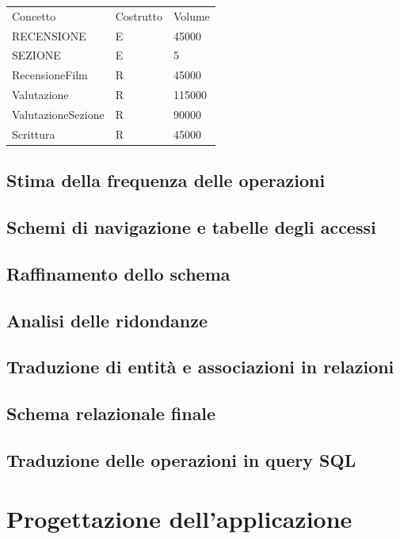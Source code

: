 \documentclass[a4paper,12pt]{report}
\begin{document}
	\begin{table}[H]
		\centering
		\begin{tabular}{|lll|}
			\hline
			\rowcolor[HTML]{FFCE93} 
			\multicolumn{3}{|l|}{\cellcolor[HTML]{FFCE93}Recensioni} \\ \hline
			\rowcolor[HTML]{CBCEFB} 
			Concetto              & Costrutto        & Volume        \\ \hline
			RECENSIONE            & E                & 45000         \\ \hline
			SEZIONE				  & E				 & 5			 \\ \hline
			RecensioneFilm        & R                & 45000         \\ \hline
			Valutazione           & R                & 115000        \\ \hline
			ValutazioneSezione    & R				 & 90000		 \\ \hline
			Scrittura             & R                & 45000         \\ \hline
		\end{tabular}
	\end{table}
	\section{Stima della frequenza delle operazioni}
	\section{Schemi di navigazione e tabelle degli accessi}
	\section{Raffinamento dello schema}
	\section{Analisi delle ridondanze}
	\section{Traduzione di entità e associazioni in relazioni}
	\section{Schema relazionale finale}
	\section{Traduzione delle operazioni in query SQL}
	\chapter{Progettazione dell'applicazione}
\end{document}
